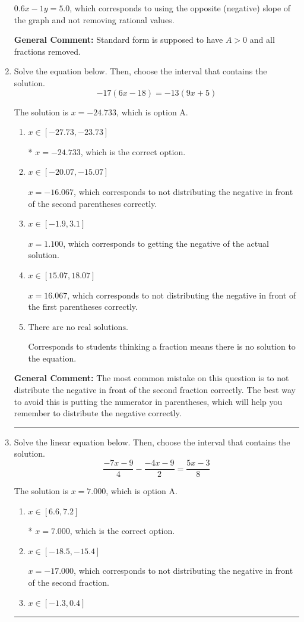 \documentclass{extbook}[14pt]
\newcommand{\litem}[1]{\item #1

\rule{\textwidth}{0.4pt}}
\begin{document}
\begin{enumerate}
{\begin{enumerate}[label=\Alph*.]
 $0.6x - 1y = 5.0$, which corresponds to using the opposite (negative) slope of the graph and not removing rational values.
\end{enumerate}

\textbf{General Comment:} Standard form is supposed to have $A > 0$ and all fractions removed.
}
\litem{
Solve the equation below. Then, choose the interval that contains the solution.
\[ -17(6x -18) = -13(9x + 5) \]

The solution is \( x = -24.733 \), which is option A.\begin{enumerate}[label=\Alph*.]
\item \( x \in [-27.73, -23.73] \)

* $x = -24.733$, which is the correct option.
\item \( x \in [-20.07, -15.07] \)

$x = -16.067$, which corresponds to not distributing the negative in front of the second parentheses correctly.
\item \( x \in [-1.9, 3.1] \)

$x = 1.100$, which corresponds to getting the negative of the actual solution.
\item \( x \in [15.07, 18.07] \)

$x = 16.067$, which corresponds to not distributing the negative in front of the first parentheses correctly.
\item \( \text{There are no real solutions.} \)

Corresponds to students thinking a fraction means there is no solution to the equation.
\end{enumerate}

\textbf{General Comment:} The most common mistake on this question is to not distribute the negative in front of the second fraction correctly. The best way to avoid this is putting the numerator in parentheses, which will help you remember to distribute the negative correctly.
}
\litem{
Solve the linear equation below. Then, choose the interval that contains the solution.
\[ \frac{-7x -9}{4} - \frac{-4x -9}{2} = \frac{5x -3}{8} \]

The solution is \( x = 7.000 \), which is option A.\begin{enumerate}[label=\Alph*.]
\item \( x \in [6.6, 7.2] \)

* $x = 7.000$, which is the correct option.
\item \( x \in [-18.5, -15.4] \)

 $x = -17.000$, which corresponds to not distributing the negative in front of the second fraction.
\item \( x \in [-1.3, 0.4] \)


\end{enumerate}}
\end{enumerate}
\end{document}
